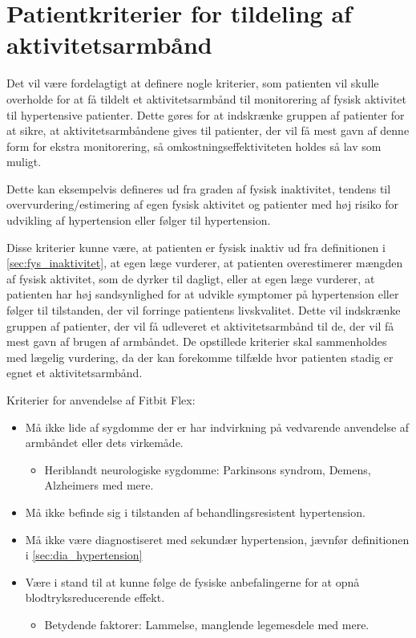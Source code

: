 \section{Patientkriterier for tildeling af aktivitetsarmbånd} \label{sec:kriterier}

Det vil være fordelagtigt at definere nogle kriterier, som patienten vil skulle overholde for at få tildelt et aktivitetsarmbånd til monitorering af fysisk aktivitet til hypertensive patienter. Dette gøres for at indskrænke gruppen af patienter for at sikre, at aktivitetsarmbåndene gives til patienter, der vil få mest gavn af denne form for ekstra monitorering, så omkostningseffektiviteten holdes så lav som muligt.

Dette kan eksempelvis defineres ud fra graden af fysisk inaktivitet, tendens til overvurdering/estimering af egen fysisk aktivitet og patienter med høj risiko for udvikling af hypertension eller følger til hypertension. 

Disse kriterier kunne være, at patienten er fysisk inaktiv ud fra definitionen i \autoref{sec:fys_inaktivitet}, at egen læge vurderer, at patienten overestimerer mængden af fysisk aktivitet, som de dyrker til dagligt, eller at egen læge vurderer, at patienten har høj sandsynlighed for at udvikle symptomer på hypertension eller følger til tilstanden, der vil forringe patientens livskvalitet. Dette vil indskrænke gruppen af patienter, der vil få udleveret et aktivitetsarmbånd til de, der vil få mest gavn af brugen af armbåndet. 
De opstillede kriterier skal sammenholdes med lægelig vurdering, da der kan forekomme tilfælde hvor patienten stadig er egnet et aktivitetsarmbånd. 

Kriterier for anvendelse af Fitbit Flex:
\begin{itemize}
\item Må ikke lide af sygdomme der er har indvirkning på vedvarende anvendelse af armbåndet eller dets virkemåde. 
	\begin{itemize}
	\item Heriblandt neurologiske sygdomme: Parkinsons syndrom, Demens, Alzheimers med mere.
	\end{itemize}

\item Må ikke befinde sig i tilstanden af behandlingsresistent hypertension. 

\item Må ikke være diagnostiseret med sekundær hypertension, jævnfør definitionen i \autoref{sec:dia_hypertension} %

\item Være i stand til at kunne følge de fysiske anbefalingerne for at opnå blodtryksreducerende effekt. 
	\begin{itemize}
	\item Betydende faktorer: Lammelse, manglende legemesdele med mere. 
	\end{itemize}  

\end{itemize}




